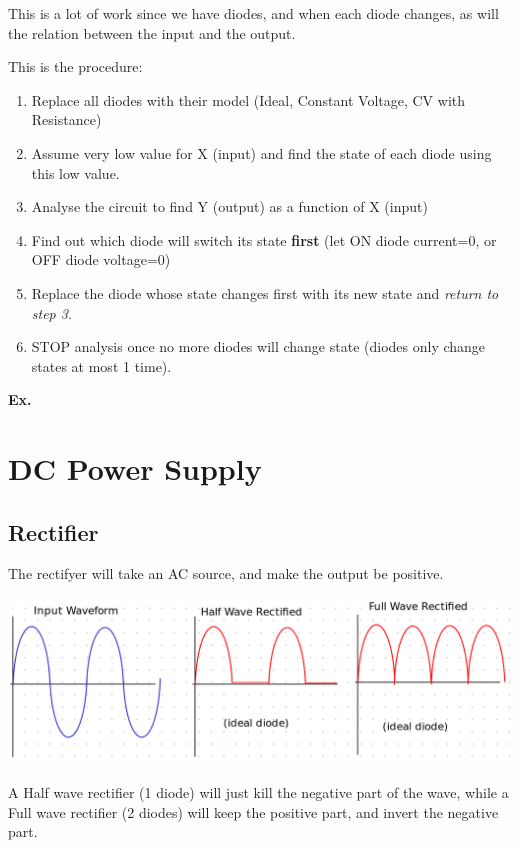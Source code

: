 \documentclass[12pt,letterpaper]{article} \usepackage{amsmath} \usepackage{graphicx} \usepackage[margin=1in]{geometry} \usepackage{longtable}  \usepackage{amssymb}
\begin{document}
	This is a lot of work since we have diodes, and when each diode changes, as will the relation between the input and the output. 
	
	This is the procedure: 
	\begin{enumerate}[noitemsep]
		\item Replace all diodes with their model (Ideal, Constant Voltage, CV with Resistance)
		\item Assume very low value for X (input) and find the state of each diode using this low value.
		\item Analyse the circuit to find Y (output) as a function of X (input)
		\item Find out which diode will switch its state \textbf{first }(let ON diode current=0, or OFF diode voltage=0)
		\item Replace the diode whose state changes first with its new state and \textit{return to step 3}. 
		\item STOP analysis once no more diodes will change state (diodes only change states at most 1 time).
	\end{enumerate}

	\begin{mdframed}[]
	\textbf{Ex. }
	\end{mdframed}
	
	\section{DC Power Supply}
	
	\subsection{Rectifier}
	The rectifyer will take an AC source, and make the output be positive.
	\begin{center}
		\includegraphics[width=0.9\linewidth]{rectifier}
	\end{center}
	
	
	A Half wave rectifier (1 diode) will just kill the negative part of the wave, while a Full wave rectifier (2 diodes) will keep the positive part, and invert the negative part. 
	
\end{document}
